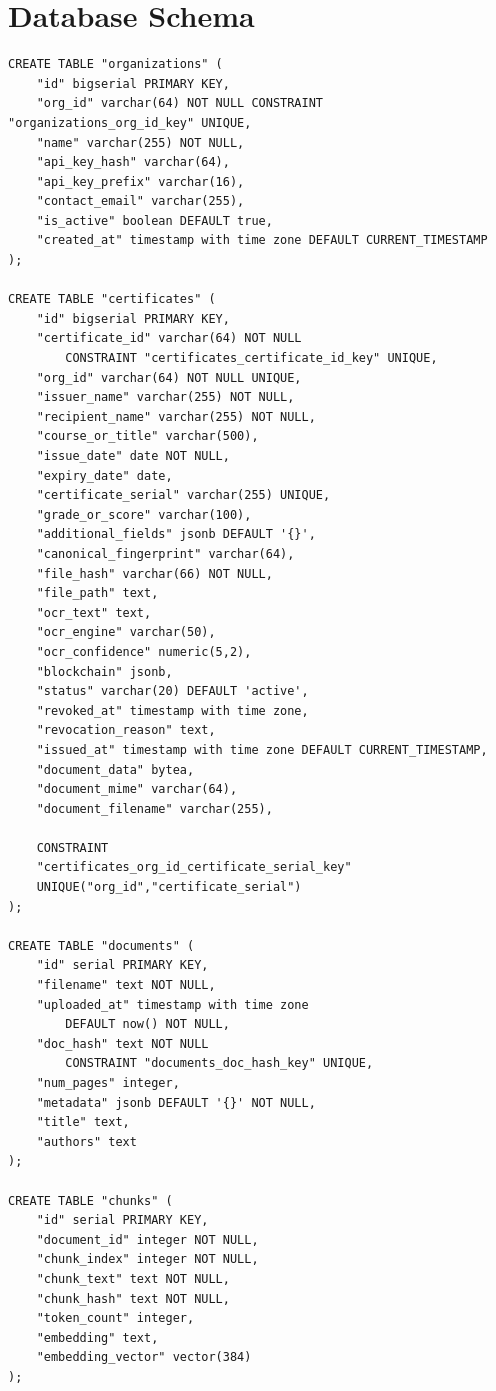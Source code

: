 
\section{Database Schema} 
\label{appendix:database}

\begin{scriptsize}
\selectfont
\begin{lstlisting}
CREATE TABLE "organizations" (
    "id" bigserial PRIMARY KEY,
    "org_id" varchar(64) NOT NULL CONSTRAINT "organizations_org_id_key" UNIQUE,
    "name" varchar(255) NOT NULL,
    "api_key_hash" varchar(64),
    "api_key_prefix" varchar(16),
    "contact_email" varchar(255),
    "is_active" boolean DEFAULT true,
    "created_at" timestamp with time zone DEFAULT CURRENT_TIMESTAMP
);

CREATE TABLE "certificates" (
    "id" bigserial PRIMARY KEY,
    "certificate_id" varchar(64) NOT NULL 
        CONSTRAINT "certificates_certificate_id_key" UNIQUE,
    "org_id" varchar(64) NOT NULL UNIQUE,
    "issuer_name" varchar(255) NOT NULL,
    "recipient_name" varchar(255) NOT NULL,
    "course_or_title" varchar(500),
    "issue_date" date NOT NULL,
    "expiry_date" date,
    "certificate_serial" varchar(255) UNIQUE,
    "grade_or_score" varchar(100),
    "additional_fields" jsonb DEFAULT '{}',
    "canonical_fingerprint" varchar(64),
    "file_hash" varchar(66) NOT NULL,
    "file_path" text,
    "ocr_text" text,
    "ocr_engine" varchar(50),
    "ocr_confidence" numeric(5,2),
    "blockchain" jsonb,
    "status" varchar(20) DEFAULT 'active',
    "revoked_at" timestamp with time zone,
    "revocation_reason" text,
    "issued_at" timestamp with time zone DEFAULT CURRENT_TIMESTAMP,
    "document_data" bytea,
    "document_mime" varchar(64),
    "document_filename" varchar(255),

    CONSTRAINT
    "certificates_org_id_certificate_serial_key"
    UNIQUE("org_id","certificate_serial")
);

CREATE TABLE "documents" (
    "id" serial PRIMARY KEY,
    "filename" text NOT NULL,
    "uploaded_at" timestamp with time zone
        DEFAULT now() NOT NULL,
    "doc_hash" text NOT NULL
        CONSTRAINT "documents_doc_hash_key" UNIQUE,
    "num_pages" integer,
    "metadata" jsonb DEFAULT '{}' NOT NULL,
    "title" text,
    "authors" text
);

CREATE TABLE "chunks" (
    "id" serial PRIMARY KEY,
    "document_id" integer NOT NULL,
    "chunk_index" integer NOT NULL,
    "chunk_text" text NOT NULL,
    "chunk_hash" text NOT NULL,
    "token_count" integer,
    "embedding" text,
    "embedding_vector" vector(384)
);



\end{lstlisting}

\end{scriptsize}


